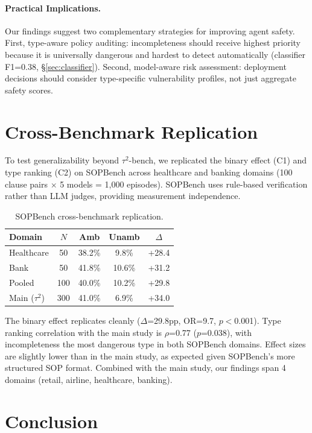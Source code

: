 \documentclass[11pt,a4paper]{article}
\begin{document}
\paragraph{Practical Implications.}
Our findings suggest two complementary strategies for improving agent safety. First, type-aware policy auditing: incompleteness should receive highest priority because it is universally dangerous and hardest to detect automatically (classifier F1=0.38, \S\ref{sec:classifier}). Second, model-aware risk assessment: deployment decisions should consider type-specific vulnerability profiles, not just aggregate safety scores.

\section{Cross-Benchmark Replication}
\label{sec:sopbench}

To test generalizability beyond $\tau^2$-bench, we replicated the binary effect (C1) and type ranking (C2) on SOPBench \cite{li2025sopbench} across healthcare and banking domains (100 clause pairs $\times$ 5 models = 1,000 episodes). SOPBench uses rule-based verification rather than LLM judges, providing measurement independence.

\begin{table}[t]
\centering
\small
\caption{SOPBench cross-benchmark replication.}
\label{tab:sopbench}
\begin{tabular}{lcccc}
\toprule
Domain & $N$ & Amb & Unamb & $\Delta$ \\
\midrule
Healthcare & 50 & 38.2\% & 9.8\% & +28.4 \\
Bank & 50 & 41.8\% & 10.6\% & +31.2 \\
Pooled & 100 & 40.0\% & 10.2\% & +29.8 \\
\midrule
Main ($\tau^2$) & 300 & 41.0\% & 6.9\% & +34.0 \\
\bottomrule
\end{tabular}
\end{table}

The binary effect replicates cleanly ($\Delta$=29.8pp, OR=9.7, $p<$0.001). Type ranking correlation with the main study is $\rho$=0.77 ($p$=0.038), with incompleteness the most dangerous type in both SOPBench domains. Effect sizes are slightly lower than in the main study, as expected given SOPBench's more structured SOP format. Combined with the main study, our findings span 4 domains (retail, airline, healthcare, banking).

\section{Conclusion}
\end{document}
